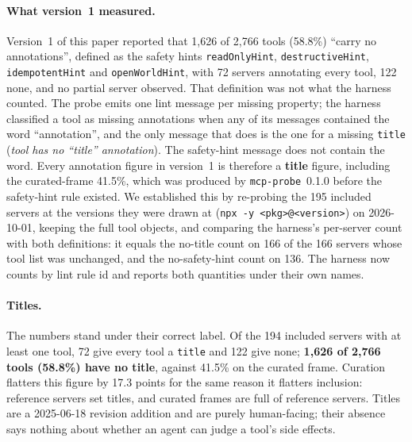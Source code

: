 \documentclass[11pt]{article}
\begin{document}
\paragraph{What version~1 measured.}
Version~1 of this paper reported that 1{,}626 of 2{,}766 tools (58.8\%) ``carry no
annotations'', defined as the safety hints \texttt{readOnlyHint},
\texttt{destructiveHint}, \texttt{idempotentHint} and \texttt{openWorldHint}, with
72 servers annotating every tool, 122 none, and no partial server observed. That
definition was not what the harness counted. The probe emits one lint message per
missing property; the harness classified a tool as missing annotations when any of
its messages contained the word ``annotation'', and the only message that does is
the one for a missing \texttt{title} (\emph{tool has no ``title'' annotation}). The
safety-hint message does not contain the word. Every annotation figure in
version~1 is therefore a \textbf{title} figure, including the curated-frame 41.5\%,
which was produced by \texttt{mcp-probe}~0.1.0 before the safety-hint rule existed.
We established this by re-probing the 195 included servers at the versions they
were drawn at (\texttt{npx -y <pkg>@<version>}) on 2026-10-01, keeping the full
tool objects, and comparing the harness's per-server count with both definitions:
it equals the no-title count on 166 of the 166 servers whose tool list was
unchanged, and the no-safety-hint count on 136. The harness now counts by lint rule
id and reports both quantities under their own names.

\paragraph{Titles.}
The numbers stand under their correct label. Of the 194 included servers with at
least one tool, 72 give every tool a \texttt{title} and 122 give none;
\textbf{1{,}626 of 2{,}766 tools (58.8\%) have no title}, against 41.5\% on the
curated frame. Curation flatters this figure by 17.3 points for the same reason it
flatters inclusion: reference servers set titles, and curated frames are full of
reference servers. Titles are a 2025-06-18 revision addition and are purely
human-facing; their absence says nothing about whether an agent can judge a tool's
side effects.
\end{document}
